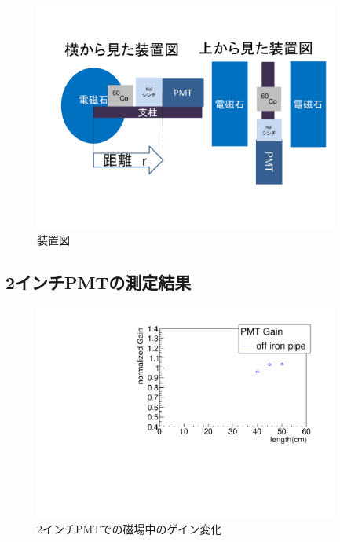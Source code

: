 \begin{figure}[H]
	\centering
		\includegraphics[width=10cm]{fig/iguchi/soutizu1.pdf}
	\caption{装置図}
	\label{soutizu1}
\end{figure}

\subsection{2インチPMTの測定結果}
\begin{figure}[H]
	\centering
		\includegraphics[angle=-90,width=10cm]{fig/iguchi/plot2inchPMT.pdf}
	\caption{2インチPMTでの磁場中のゲイン変化}
	\label{plot2inchoff}
\end{figure}


